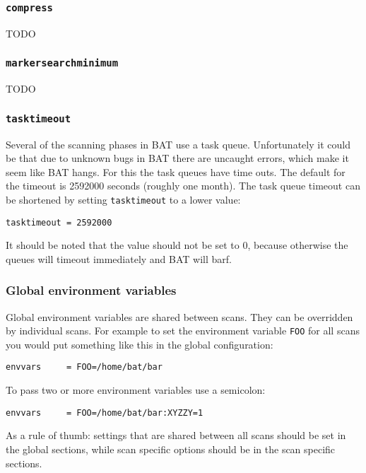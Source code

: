 \documentclass[10pt,a4paper]{article}
\begin{document}
\subsubsection{\texttt{compress}}

TODO

\subsubsection{\texttt{markersearchminimum}}

TODO

\subsubsection{\texttt{tasktimeout}}

Several of the scanning phases in BAT use a task queue. Unfortunately it could
be that due to unknown bugs in BAT there are uncaught errors, which make it
seem like BAT hangs. For this the task queues have time outs. The default for
the timeout is 2592000 seconds (roughly one month). The task queue timeout can
be shortened by setting \texttt{tasktimeout} to a lower value:

\begin{verbatim}
tasktimeout = 2592000
\end{verbatim}

It should be noted that the value should not be set to 0, because otherwise
the queues will timeout immediately and BAT will barf.

\subsubsection{Global environment variables}

Global environment variables are shared between scans. They can be overridden
by individual scans. For example to set the environment variable \texttt{FOO}
for all scans you would put something like this in the global configuration:

\begin{verbatim}
envvars     = FOO=/home/bat/bar
\end{verbatim}

To pass two or more environment variables use a semicolon:

\begin{verbatim}
envvars     = FOO=/home/bat/bar:XYZZY=1
\end{verbatim}

As a rule of thumb: settings that are shared between all scans should be set in
the global sections, while scan specific options should be in the scan
specific sections.
\end{document}
